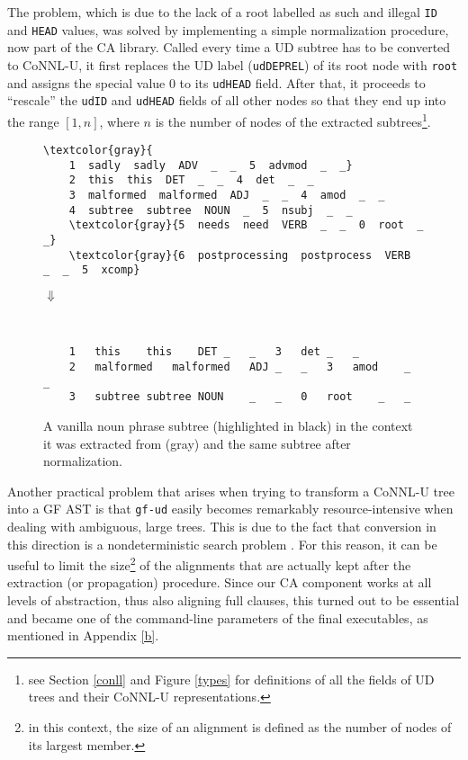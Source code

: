 The problem, which is due to the lack of a root labelled as such and illegal \texttt{ID} and \texttt{HEAD} values, was solved by implementing a simple normalization procedure, now part of the CA library. 
Called every time a UD subtree has to be converted to CoNNL-U, it first replaces the UD label (\texttt{udDEPREL}) of its root node with \texttt{root} and assigns the special value 0 to its \texttt{udHEAD} field. After that, it proceeds to ``rescale'' the \texttt{udID} and \texttt{udHEAD} fields of all other nodes so that they end up into the range $[1,n]$, where $n$ is the number of nodes of the extracted subtrees\footnote{see Section \ref{conll} and Figure \ref{types} for definitions of all the fields of UD trees and their CoNNL-U representations.}. \smallskip

\begin{figure}[H]
\small
\begin{Verbatim}[commandchars=\\\{\}]
\textcolor{gray}{   
    1  sadly  sadly  ADV  _  _  5  advmod  _  _}
    2  this  this  DET  _  _  4  det  _  _
    3  malformed  malformed  ADJ  _  _  4  amod  _  _
    4  subtree  subtree  NOUN  _  5  nsubj  _  _
    \textcolor{gray}{5  needs  need  VERB  _  _  0  root  _  _}
    \textcolor{gray}{6  postprocessing  postprocess  VERB  _  _  5  xcomp}

\end{Verbatim}
\centering
\large
$\Downarrow$
\small
\begin{verbatim}


    1	this	this	DET	_	_	3	det	_	_
    2	malformed	malformed	ADJ	_	_	3	amod	_	_
    3	subtree	subtree	NOUN	_	_	0	root	_	_
\end{verbatim}
\caption[A UD subtree and its normalization]{A vanilla noun phrase subtree (highlighted in black) in the context it was extracted from (gray) and the same subtree after normalization.}
\label{normalization}
\end{figure}

Another practical problem that arises when trying to transform a CoNNL-U tree into a GF AST is that \texttt{gf-ud} easily becomes remarkably resource-intensive when dealing with ambiguous, large trees. 
This is due to the fact that conversion in this direction is a nondeterministic search problem \cite{udgf}. 
For this reason, it can be useful to limit the size\footnote{in this context, the size of an alignment is defined as the number of nodes of its largest member.} of the alignments that are actually kept after the extraction (or propagation) procedure. Since our CA component works at all levels of abstraction, thus also aligning full clauses, this turned out to be essential and became one of the command-line parameters of the final executables, as mentioned in Appendix \ref{b}. \smallskip

